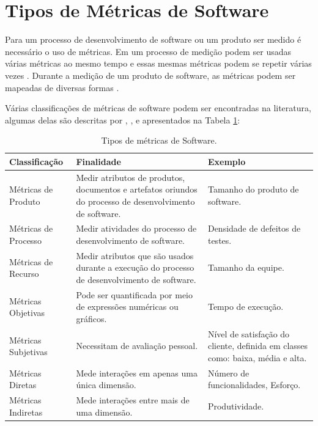 \section{Tipos de Métricas de Software}

Para um processo de desenvolvimento de software ou um produto ser medido é necessário o uso de métricas. Em um processo de medição podem ser usadas várias métricas ao mesmo tempo e essas mesmas métricas podem se repetir várias vezes \cite{sollingen}. Durante a medição de um produto de software, as métricas podem ser mapeadas de diversas formas \cite[pp~45-46]{Fenton}. 

Várias classificações de métricas de software podem ser encontradas na literatura, algumas delas são descritas por  , ,  e apresentados na Tabela \ref{tipos_metricas1}:

 	\begin{longtable}{|p{70pt}|p{220pt}|p{135pt}|}
 	\caption{Tipos de métricas de Software.} \label{tipos_metricas1}\\
 	\hline
 	 {\raggedright \textbf{Classificação}}
 	 & {\raggedright \textbf{Finalidade}}
 	 & {\raggedright \textbf{Exemplo}}\\
 	\hline
 	 {\raggedright Métricas de Produto}
 	 & {\raggedright Medir atributos de produtos, documentos e artefatos oriundos do processo de desenvolvimento de software.}
 	 & {\raggedright Tamanho do produto de software.}\\
 	\hline
 	 {\raggedright Métricas de Processo}
 	 & {\raggedright Medir atividades do processo de desenvolvimento de software.}
 	 & {\raggedright Densidade de defeitos de testes.}\\
 	\hline
 	 {\raggedright Métricas de Recurso} 
 	 & {\raggedright Medir atributos que são usados durante a execução do processo de desenvolvimento de software.}
& {\raggedright Tamanho da equipe.}\\
 	\hline
 	 {\raggedright Métricas Objetivas}
 	 & {\raggedright Pode ser quantificada por meio de expressões numéricas ou gráficos.}
 	 & {\raggedright Tempo de execução.} \\
 	\hline
 	{\raggedright Métricas Subjetivas}
 	 & {\raggedright Necessitam de avaliação pessoal.}
 	 & {\raggedright Nível de satisfação do cliente,  definida em classes como: baixa, média e alta.} \\
 	\hline
 	{\raggedright Métricas Diretas}
 	 & {\raggedright Mede interações em apenas uma única dimensão.}
 	 & {\raggedright Número de funcionalidades, Esforço.} \\
 	\hline
 	{\raggedright Métricas Indiretas}
 	 & {\raggedright Mede interações entre mais de uma  dimensão.}
 	 & {\raggedright Produtividade.} \\
 	\hline
 	
 	\end{longtable}

